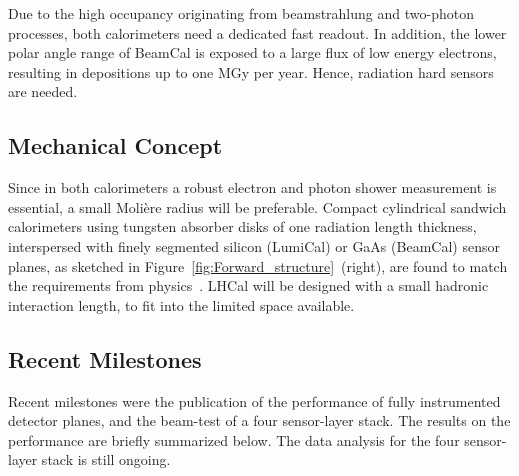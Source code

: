 Due to the high occupancy originating from beamstrahlung and two-photon processes,
both calorimeters need a dedicated fast readout.
In addition, the lower polar angle range of BeamCal is exposed to a large flux
of low energy electrons, resulting in depositions up to one
MGy per year. Hence, radiation hard sensors are needed.

\subsection{Mechanical Concept}
Since in both calorimeters a robust electron and photon shower measurement
is essential, a small Moli\`{e}re radius will be preferable.
Compact
cylindrical sandwich
calorimeters using tungsten absorber disks of one radiation length thickness, interspersed with
finely segmented silicon (LumiCal) or GaAs (BeamCal) sensor planes, as sketched in
Figure~\ref{fig:Forward_structure}~(right),
are found
to match the requirements from physics~\cite{2010JInst...512002A}.
LHCal will be designed with a small hadronic interaction length, to fit into the limited space available.

\subsection{Recent Milestones}
Recent milestones were the publication of the performance of fully instrumented detector planes, and the beam-test of a four
sensor-layer stack. The results on the performance are briefly summarized below.
The data analysis for the four sensor-layer stack is still ongoing.


